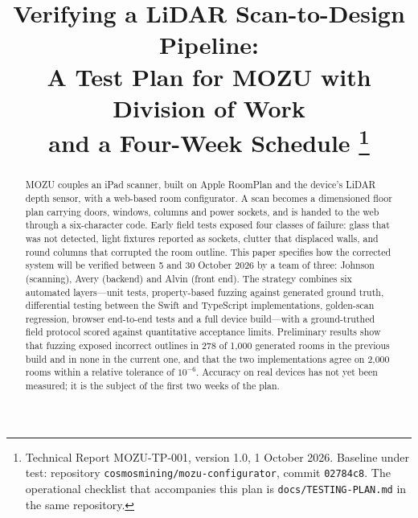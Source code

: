 \documentclass[conference,a4paper,10pt]{IEEEtran}
\begin{document}
\title{Verifying a LiDAR Scan-to-Design Pipeline:\\
A Test Plan for MOZU with Division of Work\\ and a Four-Week Schedule%
\thanks{Technical Report MOZU-TP-001, version 1.0, 1 October 2026.
Baseline under test: repository \texttt{cosmosmining/mozu-configurator},
commit \texttt{02784c8}. The operational checklist that accompanies this plan
is \texttt{docs/TESTING-PLAN.md} in the same repository.}}

\author{%
\and
{}
\and
{}
}

\maketitle

\begin{abstract}
MOZU couples an iPad scanner, built on Apple RoomPlan and the device's LiDAR
depth sensor, with a web-based room configurator. A scan becomes a dimensioned
floor plan carrying doors, windows, columns and power sockets, and is handed
to the web through a six-character code. Early field tests exposed four
classes of failure: glass that was not detected, light fixtures reported as
sockets, clutter that displaced walls, and round columns that corrupted the
room outline. This paper specifies how the corrected system will be verified
between 5 and 30 October 2026 by a team of three: Johnson (scanning), Avery
(backend) and Alvin (front end). The strategy combines six automated
layers---unit tests, property-based fuzzing against generated ground truth,
differential testing between the Swift and TypeScript implementations,
golden-scan regression, browser end-to-end tests and a full device
build---with a ground-truthed field protocol scored against quantitative
acceptance limits. Preliminary results show that fuzzing exposed incorrect
outlines in 278 of 1{,}000 generated rooms in the previous build and in none
in the current one, and that the two implementations agree on 2{,}000 rooms
within a relative tolerance of $10^{-6}$. Accuracy on real devices has not yet
been measured; it is the subject of the first two weeks of the plan.
\end{abstract}
\end{document}
